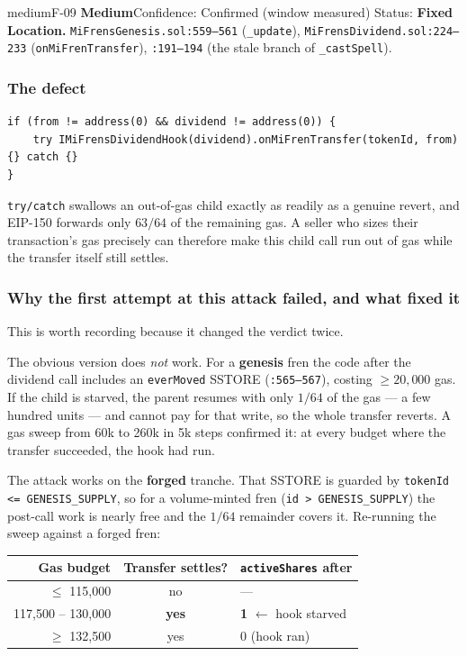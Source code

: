 \documentclass[11pt,a4paper]{article}
\newcommand{\code}[1]{\texttt{\small #1}}
\newcommand{\fileref}[1]{\texttt{\scriptsize #1}}
\begin{document}
\begin{findingbox}{medium}{F-09 \quad \textbf{Medium}\quad Confidence: Confirmed (window measured) \quad Status: \textbf{Fixed}}
\textbf{Location.} \fileref{MiFrensGenesis.sol:559--561} (\code{\_update}),
\fileref{MiFrensDividend.sol:224--233} (\code{onMiFrenTransfer}),
\fileref{:191--194} (the stale branch of \code{\_castSpell}).
\end{findingbox}

\subsubsection*{The defect}

\begin{lstlisting}
if (from != address(0) && dividend != address(0)) {
    try IMiFrensDividendHook(dividend).onMiFrenTransfer(tokenId, from) {} catch {}
}
\end{lstlisting}

\code{try/catch} swallows an out-of-gas child exactly as readily as a genuine
revert, and EIP-150 forwards only $63/64$ of the remaining gas. A seller who sizes
their transaction's gas precisely can therefore make this child call run out of
gas while the transfer itself still settles.

\subsubsection*{Why the first attempt at this attack failed, and what fixed it}

This is worth recording because it changed the verdict twice.

The obvious version does \emph{not} work. For a \textbf{genesis} fren the code
after the dividend call includes an \code{everMoved} SSTORE
(\fileref{:565--567}), costing $\geq 20{,}000$ gas. If the child is starved, the
parent resumes with only $1/64$ of the gas --- a few hundred units --- and cannot
pay for that write, so the whole transfer reverts. A gas sweep from 60k to 260k in
5k steps confirmed it: at every budget where the transfer succeeded, the hook had
run.

The attack works on the \textbf{forged} tranche. That SSTORE is guarded by
\code{tokenId <= GENESIS\_SUPPLY}, so for a volume-minted fren
(\code{id > GENESIS\_SUPPLY}) the post-call work is nearly free and the $1/64$
remainder covers it. Re-running the sweep against a forged fren:

\begin{center}\small
\begin{tabular}{@{}rcl@{}}
\toprule
\textbf{Gas budget} & \textbf{Transfer settles?} & \textbf{\code{activeShares} after} \\
\midrule
$\leq$ 115{,}000 & no & --- \\
\rowcolor{panel!80} 117{,}500 -- 130{,}000 & \textbf{yes} & \textbf{1} \quad\textcolor{critical}{$\leftarrow$ hook starved} \\
$\geq$ 132{,}500 & yes & 0 \quad(hook ran) \\
\bottomrule
\end{tabular}
\end{center}
\end{document}
